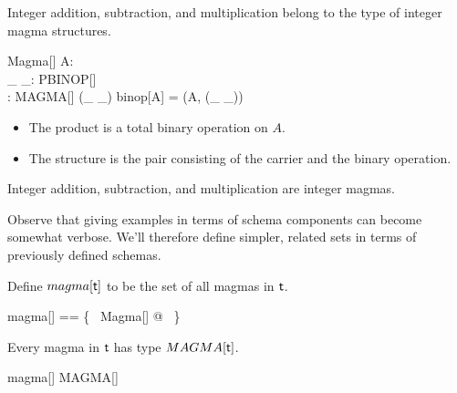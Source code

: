 \documentclass{amsart}
\begin{document}

\begin{example}
Integer addition, subtraction, and multiplication belong to the type of integer magma structures.


\end{example}

\begin{schema}{Magma}[\genT]
	A: \power \genT \\
	\_ \opG \_: PBINOP[\genT] \\
	\strucA: MAGMA[\genT]
\where
	(\_ \opG \_) \in binop[A]
\also
	\strucA = (A, (\_ \opG \_))
\end{schema}

\begin{itemize}
	\item The product is a total binary operation on $A$.
	\item The structure is the pair consisting of the carrier and the binary operation.
\end{itemize}

\begin{example}
Integer addition, subtraction, and multiplication are integer magmas.


\end{example}

Observe that giving examples in terms of schema components can become somewhat verbose.
We'll therefore define simpler, related sets in terms of previously defined schemas.

Define $magma[\mathsf{t}]$ to be the set of all magmas in $\mathsf{t}$.

\begin{zed}
	magma[\genT] == \{~ Magma[\genT] @ \strucA ~\}
\end{zed}

\begin{remark}
Every magma in $\mathsf{t}$ has type $MAGMA[\mathsf{t}]$.

\begin{zed}
	magma[\setT] \subseteq MAGMA[\setT]
\end{zed}

\end{remark}
\end{document}
